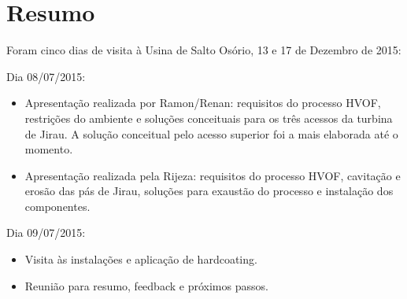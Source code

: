 \section{Resumo}
Foram cinco dias de visita à Usina de Salto Osório, 13 e 17 de Dezembro de 2015:

Dia 08/07/2015:
\begin{itemize}
  \item Apresentação realizada por Ramon/Renan: requisitos do processo HVOF,
  restrições do ambiente e soluções conceituais para os três acessos da turbina de
  Jirau. A solução conceitual pelo acesso superior foi a mais elaborada até
  o momento.
  \item Apresentação realizada pela Rijeza: requisitos do processo HVOF,
  cavitação e erosão das pás de Jirau, soluções para exaustão do processo e
  instalação dos componentes.
\end{itemize}

Dia 09/07/2015:
\begin{itemize}
  \item Visita às instalações e aplicação de hardcoating.
  \item Reunião para resumo, feedback e próximos passos.
\end{itemize}
